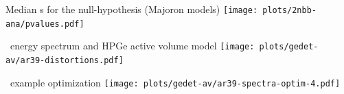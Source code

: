 \documentclass[10pt,aspectratio=169]{beamer}
\begin{document}
\begin{frame}{Median \pvalue{}s for the null-hypothesis (Majoron models)}
  \centering
  \texttt{[image: plots/2nbb-ana/pvalues.pdf]}
\end{frame}
\begin{frame}{\Arl\ energy spectrum and HPGe active volume model}
  \centering
  \texttt{[image: plots/gedet-av/ar39-distortions.pdf]}
\end{frame}
\begin{frame}{\Arl\ example optimization}
  \centering
  \texttt{[image: plots/gedet-av/ar39-spectra-optim-4.pdf]}
\end{frame}
\end{document}
